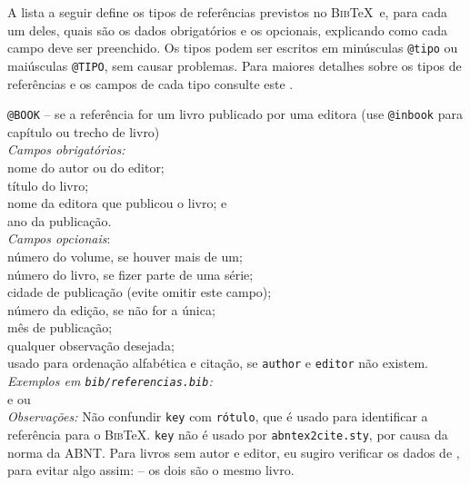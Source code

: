 A lista a seguir define os tipos de referências previstos no 
\textsc{Bib}\TeX\ e, para cada um deles, quais são os dados 
obrigatórios e os opcionais, explicando como cada campo
deve ser preenchido. Os tipos podem ser escritos em minúsculas
\verb|@tipo| ou maiúsculas \verb|@TIPO|, sem causar problemas. 
Para maiores detalhes sobre os tipos de referências e os campos
de cada tipo consulte este 
\href{http://bib-it.sourceforge.net/help/fieldsAndEntryTypes.php}
{}.
\begin{alineas}

	\item \verb|@BOOK| -- se a referência for um livro publicado por uma
		editora (use \verb|@inbook| para capítulo ou trecho de livro) \\
		\emph{Campos obrigatórios:}\\
 			 nome do autor ou do editor;\\
 			 título do livro;\\
 			 nome da editora que publicou o livro; e \\
 			 ano da publicação.\\
		\emph{Campos opcionais}:\\
			 número do volume, se houver mais de um; \\
			 número do livro, se fizer parte de uma série;\\
 			 cidade de publicação (evite omitir este campo);\\
 			 número da edição, se não for a única;\\
 			 mês de publicação;\\
 			 qualquer observação desejada; \\
 			 usado para ordenação alfabética e citação, se
 				\texttt{author} e \texttt{editor} não existem.\\
		\emph{Exemplos em \texttt{bib/referencias.bib}:} \\
			\hspace*{1em} e  ou 
			\cite{hay82,kop95,epe13,epe13b}\\
		\emph{Observações:} Não confundir \texttt{key}
 				com \texttt{rótulo}, que é usado para identificar a 
 				referência para o \textsc{Bib}\TeX. \texttt{key} não
 				é usado por \texttt{abntex2cite.sty}, por causa da 
 				norma da ABNT. Para livros sem autor e editor, eu sugiro 
 				verificar os dados de , para evitar
 				algo assim:  -- os dois são o
 				mesmo livro.
 				

\end{alineas}
